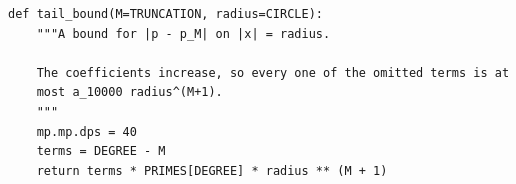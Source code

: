 \begin{verbatim}
def tail_bound(M=TRUNCATION, radius=CIRCLE):
    """A bound for |p - p_M| on |x| = radius.

    The coefficients increase, so every one of the omitted terms is at
    most a_10000 radius^(M+1).
    """
    mp.mp.dps = 40
    terms = DEGREE - M
    return terms * PRIMES[DEGREE] * radius ** (M + 1)
\end{verbatim}
